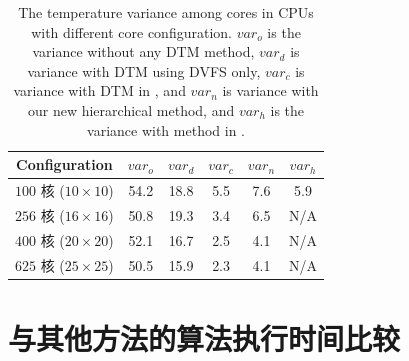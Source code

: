 \begin{table}
\centering
 \caption{The temperature variance among cores in CPUs with different core
   configuration. $var_o$ is the variance without
any DTM method,  
$var_d$ is variance with DTM using DVFS only, 
$var_c$ is variance with DTM in \cite{MaWang:APCCAS'14}, 
and $var_n$ is variance with our
new hierarchical method, and $var_h$ is the variance with method in \cite{Hanumaiah:TCAD'11}. \label{tab:var}}{
 \begin{tabular}{|c|c|c|c|c|c|}
 \hline
 \hline
 Configuration  & $var_o$ & $var_d$ & $var_c$ & $var_n$ & $var_h$ \\
 \hline 
 \hline
 $100$ 核 ($10 \times 10$) & 54.2 & 18.8 & 5.5 & 7.6 & 5.9\\

 \hline
 $256$ 核 ($16 \times 16$) & 50.8 & 19.3 & 3.4 & 6.5 & N/A\\
 \hline
 $400$ 核 ($20 \times 20$) & 52.1 & 16.7 & 2.5 & 4.1 & N/A\\
 \hline
 $625$ 核 ($25 \times 25$) & 50.5 & 15.9 & 2.3 & 4.1 & N/A\\
 \hline
 \hline
 \end{tabular}}
 \end{table}
 
 \section{与其他方法的算法执行时间比较}\label{sec:time_comp}
 
